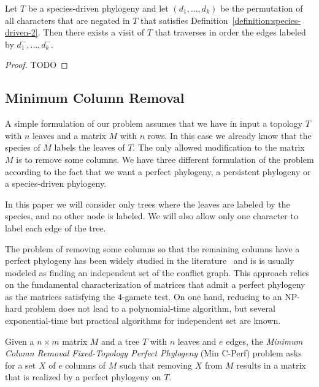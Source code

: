 \begin{lemma}
\label{lemma:same-order-of-algorithm-for-species-driven-test}
Let $T$ be a species-driven phylogeny and let $(d_{1}, \ldots,
d_{k})$ be the permutation of all characters that are negated in $T$
that satisfies Definition~\ref{definition:species-driven-2}.
Then there exists a visit of $T$ that traverses in order the edges
labeled by $d_{1}^{-}, \ldots, d_{k}^{-}$.
\end{lemma}

\begin{proof}
TODO
\end{proof}

\subsection*{Minimum Column Removal}

A simple formulation of our problem assumes that we have in input a
topology $T$ with $n$ leaves and a matrix $M$ with $n$ rows.
In this case we already know that the species of $M$ labels the leaves
of $T$.
The only allowed modification to the matrix $M$ is to remove some columns.
We have three different formulation of the problem according to the
fact that we want a perfect phylogeny, a persistent phylogeny or a
species-driven phylogeny.


In this paper we will consider only trees where the leaves are labeled
by the species, and no other node is labeled.
We will also allow only one character to label each edge of the tree.





The problem of removing some columns so that the remaining columns
have a perfect phylogeny has been widely studied in the
literature~\cite{rens_snv-ppilp:_2015} and is is usually  modeled as
finding an independent set of the conflict graph.
This approach relies on the fundamental characterization of matrices
that admit a perfect phylogeny as the matrices satisfying the 4-gamete test.
On one hand, reducing to an NP-hard problem does not lead to a
polynomial-time algorithm, but several exponential-time but practical
algorithms for independent set are known.

\begin{definition}
\label{definition:perfect-problem}
Given a $n\times m$ matrix $M$ and a tree $T$ with $n$ leaves and $e$
edges, the
\emph{Minimum Column Removal Fixed-Topology Perfect Phylogeny} (Min
C-Perf) problem asks for a set $X$ of $e$ columns of $M$ such
that removing $X$ from $M$ results in a matrix that is realized by a
perfect phylogeny on $T$.
\end{definition}


